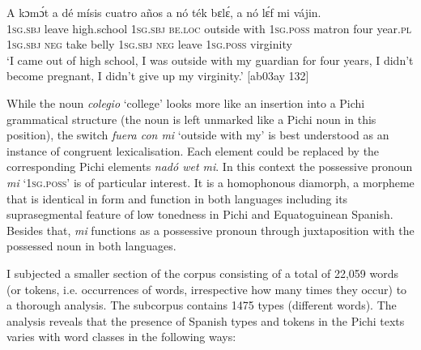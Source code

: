 \ea%
    \label{ex:key:1695}
    \gll A    kɔmɔ́t  \textstylePichiexamplebold{\textmd{,}}    a    dé          
mísis  cuatro  años    a    nó  ték  bɛlɛ́,
a    nó  lɛ́f    mi    vájin.\\
\textsc{1sg.sbj}  leave  high.school  \textsc{1sg.sbj}  \textsc{be.loc}  outside  with    \textsc{1sg.poss}
matron  four    year.\textsc{pl}  \textsc{1sg.sbj}  \textsc{neg}  take  belly
\textsc{1sg.sbj}  \textsc{neg}  leave  \textsc{1sg.poss}  virginity\\
\glt ‘I came out of high school, I was outside with my guardian for four years, 
I didn’t become pregnant, I didn’t give up my virginity.’ [ab03ay 132]
\z

While the noun \textit{colegio} ‘college’ looks more like an insertion into a Pichi grammatical structure (the noun is left unmarked like a Pichi noun in this position), the switch \textit{fuera con mi} ‘outside with my’ is best understood as an instance of congruent lexicalisation. Each element could be replaced by the corresponding Pichi elements \textit{nadó wet mi}. In this context the possessive pronoun \textit{mi} ‘\textsc{1sg.poss}’ is of particular interest. It is a homophonous diamorph, a morpheme that is identical in form and function in both languages including its suprasegmental feature of low tonedness in Pichi and Equatoguinean Spanish. Besides that, \textit{mi} functions as a possessive pronoun through juxtaposition with the possessed noun in both languages. 


I subjected a smaller section of the corpus consisting of a total of 22,059 words (or tokens, i.e. occurrences of words, irrespective how many times they occur) to a thorough analysis. The subcorpus contains 1475 types (different words). The analysis reveals that the presence of Spanish types and tokens in the Pichi texts varies with word classes in the following ways: 


